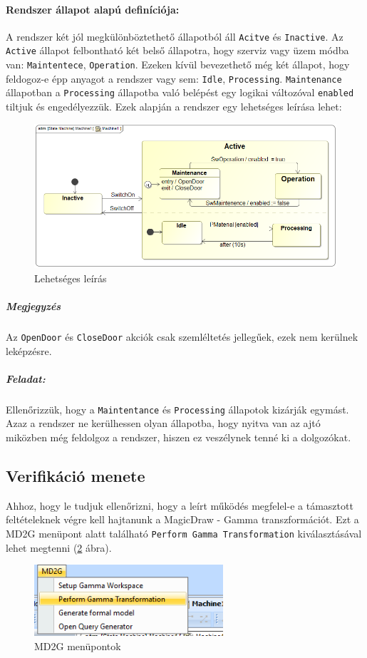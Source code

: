 \paragraph{Rendszer állapot alapú definíciója:} A rendszer két jól megkülönböztethető állapotból áll \verb+Acitve+ és \verb+Inactive+. Az \verb+Active+ állapot felbontható két belső állapotra, hogy szerviz vagy üzem módba van: \verb+Maintentece+, \verb+Operation+. Ezeken kívül bevezethető még két állapot, hogy feldogoz-e épp anyagot a rendszer vagy sem: \verb+Idle+, \verb+Processing+. \verb+Maintenance+ állapotban a \verb+Processing+ állapotba való belépést egy logikai változóval \verb+enabled+ tiltjuk és engedélyezzük. Ezek alapján a rendszer egy lehetséges leírása lehet:
\begin{figure}[H]
	\centering
	\includegraphics[keepaspectratio, width=150mm]{figures/machine1.png}
	\caption{Lehetséges leírás}
	\label{fig:leiras}
\end{figure}
\subparagraph{Megjegyzés} Az \verb+OpenDoor+ és \verb+CloseDoor+ akciók csak szemléltetés jellegűek, ezek nem kerülnek leképzésre.
\subparagraph{Feladat:} Ellenőrizzük, hogy a \verb+Maintentance+ és \verb+Processing+ állapotok kizárják egymást. Azaz a rendszer ne kerülhessen olyan állapotba, hogy nyitva van az ajtó miközben még feldolgoz a rendszer, hiszen ez veszélynek tenné ki a dolgozókat.
\subsection{Verifikáció menete}
Ahhoz, hogy le tudjuk ellenőrizni, hogy a leírt működés megfelel-e a támasztott feltételeknek végre kell hajtanunk a MagicDraw - Gamma transzformációt. Ezt a MD2G menüpont alatt található \verb+Perform Gamma Transformation+ kiválasztásával lehet megtenni (\ref{fig:md2g} ábra).
\begin{figure}[H]
	\centering
	\includegraphics[keepaspectratio, width=70mm]{figures/GammaTrafo.png}
	\caption{MD2G menüpontok}
	\label{fig:md2g}
\end{figure}

